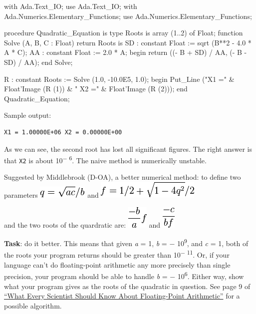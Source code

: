\begin{wideverbatim}
with Ada.Text_IO;                        use Ada.Text_IO;
with Ada.Numerics.Elementary_Functions;  use Ada.Numerics.Elementary_Functions;
 
procedure Quadratic_Equation is
   type Roots is array (1..2) of Float;
   function Solve (A, B, C : Float) return Roots is
      SD : constant Float := sqrt (B**2 - 4.0 * A * C);
      AA : constant Float := 2.0 * A;
   begin
      return ((- B + SD) / AA, (- B - SD) / AA);
   end Solve;
 
   R : constant Roots := Solve (1.0, -10.0E5, 1.0);
begin
   Put_Line ("X1 =" & Float'Image (R (1)) & " X2 =" & Float'Image (R (2)));
end Quadratic_Equation;
\end{wideverbatim}

Sample output:

\begin{verbatim}
X1 = 1.00000E+06 X2 = 0.00000E+00
\end{verbatim}

As we can see, the second root has lost all significant figures. The
right answer is that \texttt{X2} is about 10\textsuperscript{− 6}. The
naive method is numerically unstable.

Suggested by Middlebrook (D-OA), a better numerical method: to define
two parameters
\includegraphics[scale=.6]{graphics/1b0829cacb50a2b671f2807fe80c911c.png}
and
\includegraphics[scale=.6]{graphics/688bcacb300f8efe5d6d8f6411d13d96.png}

and the two roots of the quardratic are:
\includegraphics[scale=.6]{graphics/4bcc0c5a2bb6223fa81b5bc6f0001367.png}
and
\includegraphics[scale=.6]{graphics/06242fdab96c6fc34555b2d3ac36ff56.png}

\textbf{Task}: do it better. This means that given \emph{a} = 1,
\emph{b} = − 10\textsuperscript{9}, and \emph{c} = 1, both of the roots
your program returns should be greater than 10\textsuperscript{− 11}.
Or, if your language can't do floating-point arithmetic any more
precisely than single precision, your program should be able to handle
\emph{b} = − 10\textsuperscript{6}. Either way, show what your program
gives as the roots of the quadratic in question. See page 9 of
\href{http://dlc.sun.com/pdf/800-7895/800-7895.pdf}{``What Every
Scientist Should Know About Floating-Point Arithmetic''} for a possible
algorithm.

